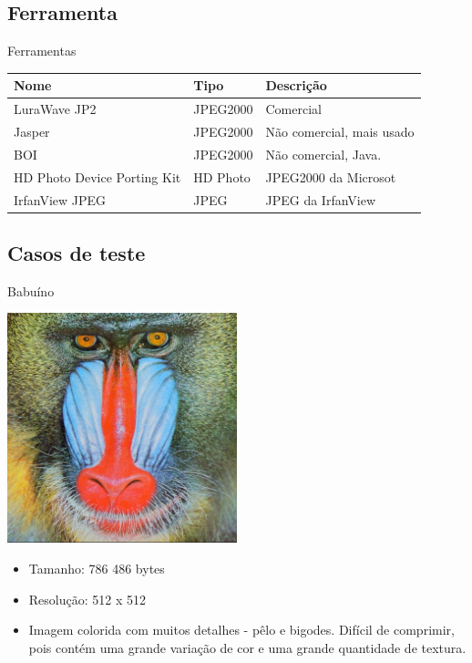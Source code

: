 \documentclass{beamer}
\begin{document}
  \subsection{Ferramenta}
  \begin{frame}{Ferramentas}
    \begin{tabular}{| l | l | l |}
      \hline
      \textbf{Nome} & \textbf{Tipo} & \textbf{Descrição} \\
      \hline
      LuraWave JP2 & JPEG2000 & Comercial \\
      \hline
      Jasper & JPEG2000 & Não comercial, mais usado \\
      \hline
      BOI & JPEG2000 & Não comercial, Java. \\
      \hline
      HD Photo Device Porting Kit & HD Photo & JPEG2000 da Microsot \\
      \hline
      IrfanView JPEG & JPEG & JPEG da IrfanView \\
      \hline
    \end{tabular}
  \end{frame}

  \subsection{Casos de teste}
  \begin{frame}{Babuíno}
    \begin{multicols}{2}
      \includegraphics[width=0.5\textwidth]{figure/baboon100.jpg}
      \begin{itemize}
        \item Tamanho: 786 486 bytes
        \item Resolução: 512 x 512
        \item Imagem colorida com muitos detalhes - pêlo e bigodes. Difícil de comprimir, pois contém uma grande variação de cor e uma grande quantidade de textura.
      \end{itemize}
    \end{multicols}
  \end{frame}
\end{document}
